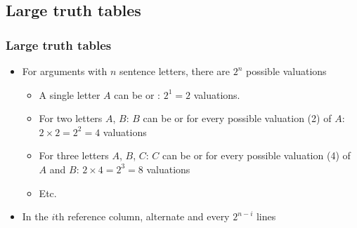 \subsection{Large truth tables}

\begin{frame}
\frametitle{Large truth tables}

\begin{itemize}[<+->]
\item For arguments with $n$ sentence letters, there are $2^n$
possible valuations
\begin{itemize}[<+->]
\item A single letter $A$ can be \True{} or \False{}: $2^1 = 2$ valuations.
\item For two letters $A$, $B$: $B$ can be \True{} or \False{} for every
possible valuation (2) of $A$: $2 \times 2 = 2^2 = 4$ valuations
\item For three letters $A$, $B$, $C$: $C$ can be \True{} or \False{}
for every possible valuation (4) of $A$ and $B$: $2 \times 4 = 2^3 =
8$ valuations
\item Etc.
\end{itemize}
\item In the $i$th reference column, alternate \True{} and \False{}
every $2^{n-i}$ lines
\end{itemize}
\end{frame}


